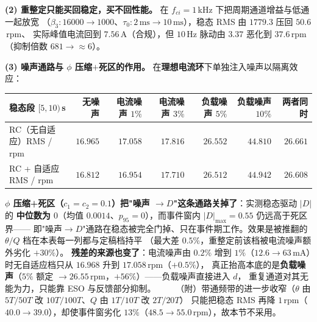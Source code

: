\documentclass[11pt]{article}
\theoremstyle{remark}\newtheorem{remark}{注}
\begin{document}
\noindent\textbf{(2) 重整定只能买回稳定，买不回性能。} 在 $f_{ci}=1$\,kHz 下把周期通道增益与低通一起放宽
（$\beta_3:16000\to1000$、$\tau_0:2\,\mathrm{ms}\to10\,\mathrm{ms}$），稳态 RMS 由 $1779.3$ 压回 $50.6$\,rpm、
实际峰值电流回到 $7.56$\,A（合规），但 $10$\,Hz 脉动由 $3.37$ 恶化到 $37.6$\,rpm
（抑制倍数 $681\to\approx6$）。
\vspace{1mm}

\noindent\textbf{(3) 噪声通路与 $\phi$ 压缩$+$死区的作用。} 在\textbf{理想电流环}下单独注入噪声以隔离效应：
\begin{center}
\footnotesize
\begin{tabular}{@{}lrrrrrr@{}}
\toprule
稳态段 $[5,10)$\,s & 无噪声 & 电流噪声 $1\%$ & 电流噪声 $3\%$ & 负载噪声 $5\%$ & 负载噪声 $10\%$ & 两者同时\\
\midrule
RC（无自适应）RMS / rpm & $16.965$ & $17.058$ & $17.816$ & $26.552$ & $44.810$ & $26.661$\\
RC + 自适应 RMS / rpm & $16.812$ & $16.954$ & $17.710$ & $26.512$ & $44.942$ & $26.608$\\
\bottomrule
\end{tabular}
\end{center}
\textbf{$\phi$ 压缩+死区（$c_1=c_2=0.1$）把"噪声 $\to D$"这条通路关掉了}：实测稳态驱动 $|D|$ 的
\textbf{中位数为 $0$}（均值 $0.0014$、$p_{95}=0$），而事件窗内 $|D|_{\max}=0.55$ 仍远高于死区界——
即"噪声$\to D$"通路在稳态被完全门掉、只在事件期工作。效果是被推翻的 $\theta/Q$ 档在本表每一列都与定稿档持平
（最大差 $0.5\%$，重整定前该档被电流噪声额外劣化 $+30\%$）。
\textbf{残差的来源也变了}：电流噪声由 $0.2\%$ 增到 $1\%$（$12.6\to63$\,mA）时无自适应档只从 $16.968$ 升到 $17.058$\,rpm（$+0.5\%$），
真正抬高本底的是\textbf{负载噪声}（$5\%$ 额定 $\to26.55$\,rpm，$+56\%$）——负载噪声直接进入 $d$，
重复通道对其无能为力，只能靠 ESO 与反馈部分抑制。
$\qquad$（附）带通频带的进一步收窄（$\theta$ 由 $5T/50T$ 改 $10T/100T$、$Q$ 由 $1T/10T$ 改 $2T/20T$）
只能把稳态 RMS 再降 $1$\,rpm（$40.0\to39.0$），却使事件窗劣化 $13\%$（$48.5\to55.0$\,rpm），故本节不采用。
\vspace{1mm}
\end{document}

